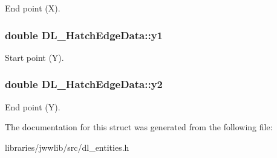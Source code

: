 End point (X). \hypertarget{structDL__HatchEdgeData_acabe11145ee03a08a6a67fe736a77a4f}{
\subsubsection[{y1}]{\setlength{\rightskip}{0pt plus 5cm}double D\-L\-\_\-\-Hatch\-Edge\-Data\-::y1}}\label{structDL__HatchEdgeData_acabe11145ee03a08a6a67fe736a77a4f}
Start point (Y). \hypertarget{structDL__HatchEdgeData_a8f8ebf143e0b70985add9bfd10590e06}{
\subsubsection[{y2}]{\setlength{\rightskip}{0pt plus 5cm}double D\-L\-\_\-\-Hatch\-Edge\-Data\-::y2}}\label{structDL__HatchEdgeData_a8f8ebf143e0b70985add9bfd10590e06}
End point (Y). 

The documentation for this struct was generated from the following file\-:\begin{DoxyCompactItemize}
\item 
libraries/jwwlib/src/dl\-\_\-entities.\-h\end{DoxyCompactItemize}
